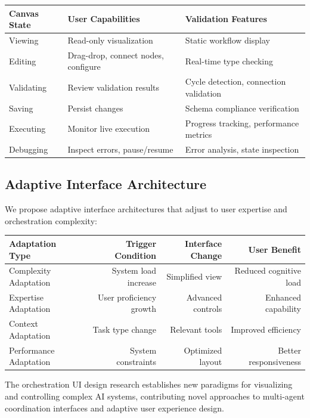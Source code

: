 \begin{center}
\begin{tabular}{@{}lll@{}}
\toprule
\textbf{Canvas State} & \textbf{User Capabilities} & \textbf{Validation Features} \\
\midrule
Viewing & Read-only visualization & Static workflow display \\
Editing & Drag-drop, connect nodes, configure & Real-time type checking \\
Validating & Review validation results & Cycle detection, connection validation \\
Saving & Persist changes & Schema compliance verification \\
Executing & Monitor live execution & Progress tracking, performance metrics \\
Debugging & Inspect errors, pause/resume & Error analysis, state inspection \\
\bottomrule
\end{tabular}
\end{center}

\subsection*{Adaptive Interface Architecture}

We propose adaptive interface architectures that adjust to user expertise and orchestration complexity:

\begin{center}
\begin{tabular}{@{}lrrr@{}}
\toprule
\textbf{Adaptation Type} & \textbf{Trigger Condition} & \textbf{Interface Change} & \textbf{User Benefit} \\
\midrule
Complexity Adaptation & System load increase & Simplified view & Reduced cognitive load \\
Expertise Adaptation & User proficiency growth & Advanced controls & Enhanced capability \\
Context Adaptation & Task type change & Relevant tools & Improved efficiency \\
Performance Adaptation & System constraints & Optimized layout & Better responsiveness \\
\bottomrule
\end{tabular}
\end{center}

The orchestration UI design research establishes new paradigms for visualizing and controlling complex AI systems, contributing novel approaches to multi-agent coordination interfaces and adaptive user experience design.